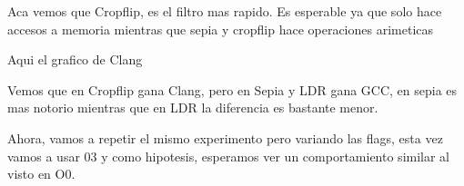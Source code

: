 Aca vemos que Cropflip, es el filtro mas rapido. Es esperable ya que solo hace accesos a memoria mientras que sepia y cropflip hace operaciones arimeticas

Aqui el grafico de Clang

\begin{figure}[H]
    \centering
    \begin{floatrow}
    \end{floatrow}
\end{figure}

Vemos que en Cropflip gana Clang, pero en Sepia y LDR gana GCC, en sepia es mas notorio mientras que en LDR la diferencia es bastante menor.


Ahora, vamos a repetir el mismo experimento pero variando las flags, esta vez vamos a usar 03 y como hipotesis, esperamos ver un comportamiento similar al visto en O0.
\begin{figure}[H]
    \centering
    \begin{floatrow}
    \end{floatrow}
\end{figure}


